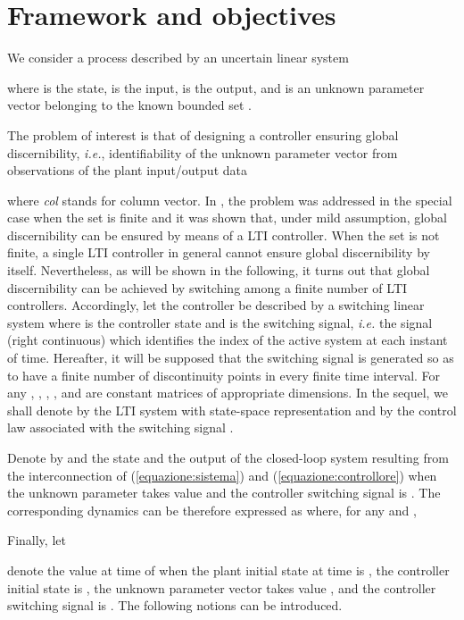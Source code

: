 \documentclass[letterpaper, 10 pt, conference]{ieeetran}
\begin{document}
\section{Framework and objectives}\label{overview}


We consider a process described by an uncertain linear system  

where  is the state, 
 is the input,  
is the output, and  is 
an unknown parameter vector belonging to the known
bounded set .

The problem of interest is that of designing a controller 
ensuring global discernibility, \emph{i.e.}, identifiability of 
the unknown parameter vector  from observations of the plant input/output data 

where {\em col} stands for column vector. 
In \cite{BaBaTe14}, the problem was addressed in the special case when the set  is finite and it was shown that, 
under mild assumption, global discernibility can be ensured by means of a LTI controller. When the set  is not finite, a single LTI controller
in general cannot ensure global discernibility by itself. Nevertheless, as will be shown in the following, it turns out that global discernibility can be achieved
by switching among a finite number of LTI controllers. Accordingly, let the controller be described by a switching linear system
where  is the controller state and
 is the 
switching signal, \emph{i.e.} the signal 
(right continuous) which identifies 
the index of the active system at each instant of time. Hereafter, it will be supposed that the switching signal 
is generated so as to have a finite number of discontinuity points in every finite time interval.
For any , , , , and  are constant matrices of appropriate dimensions.
In the sequel, we shall denote 
by  the LTI system with state-space representation  and by 
the control law associated with the switching signal .

Denote by  and 
the state and the output of the closed-loop system  resulting from 
the interconnection of (\ref{equazione:sistema}) and (\ref{equazione:controllore})
when the unknown parameter takes value  and the controller switching signal is .
The corresponding dynamics can be therefore expressed as
{\setlength\arraycolsep{1pt}
\label{}
}where, for any  and ,
 
Finally, let 

denote the value at time  of  
when the plant initial state at time  is , 
the controller initial state is , the unknown parameter vector takes value , and the controller switching signal is .
The following notions 
can be introduced. 
\end{document}
